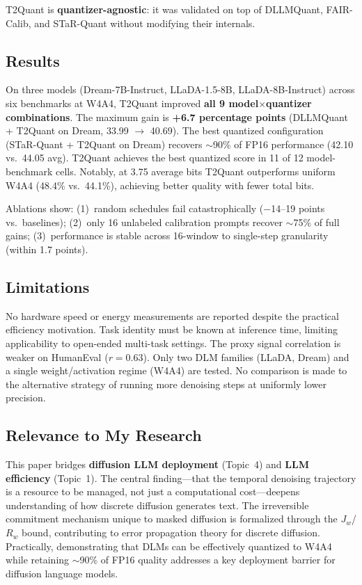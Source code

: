 \documentclass[11pt,a4paper]{article}
\begin{document}
T2Quant is \textbf{quantizer-agnostic}: it was validated on top of DLLMQuant, FAIR-Calib, and STaR-Quant without modifying their internals.

\subsection{Results}
On three models (Dream-7B-Instruct, LLaDA-1.5-8B, LLaDA-8B-Instruct) across six benchmarks at W4A4, T2Quant improved \textbf{all 9 model$\times$quantizer combinations}. The maximum gain is \textbf{+6.7 percentage points} (DLLMQuant + T2Quant on Dream, 33.99 $\to$ 40.69). The best quantized configuration (STaR-Quant + T2Quant on Dream) recovers ${\sim}$90\% of FP16 performance (42.10 vs.\ 44.05 avg). T2Quant achieves the best quantized score in 11 of 12 model-benchmark cells. Notably, at 3.75 average bits T2Quant outperforms uniform W4A4 (48.4\% vs.\ 44.1\%), achieving better quality with fewer total bits.

Ablations show: (1)~random schedules fail catastrophically ($-$14--19 points vs.\ baselines); (2)~only 16 unlabeled calibration prompts recover ${\sim}$75\% of full gains; (3)~performance is stable across 16-window to single-step granularity (within 1.7 points).

\subsection{Limitations}
No hardware speed or energy measurements are reported despite the practical efficiency motivation. Task identity must be known at inference time, limiting applicability to open-ended multi-task settings. The proxy signal correlation is weaker on HumanEval ($r = 0.63$). Only two DLM families (LLaDA, Dream) and a single weight/activation regime (W4A4) are tested. No comparison is made to the alternative strategy of running more denoising steps at uniformly lower precision.

\subsection{Relevance to My Research}
This paper bridges \textbf{diffusion LLM deployment} (Topic~4) and \textbf{LLM efficiency} (Topic~1). The central finding---that the temporal denoising trajectory is a resource to be managed, not just a computational cost---deepens understanding of how discrete diffusion generates text. The irreversible commitment mechanism unique to masked diffusion is formalized through the $J_w$/$R_w$ bound, contributing to error propagation theory for discrete diffusion. Practically, demonstrating that DLMs can be effectively quantized to W4A4 while retaining ${\sim}$90\% of FP16 quality addresses a key deployment barrier for diffusion language models.
\end{document}
